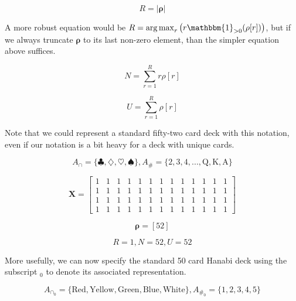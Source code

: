\documentclass{article}
\DeclareMathOperator*{\argmax}{arg\,max}
\begin{document}
\begin{equation}
    R = \lvert\bm{\rho}\rvert
\end{equation}

A more robust equation would be $R = \argmax_r{ \left ( r\mathbbm{1}_{>0}(\rho[r])\right )}$, but if we always truncate $\bm{\rho}$ to its last non-zero element, than the simpler equation above suffices.

\begin{equation}
    N = \sum_{r=1}^{R} r \rho[r]
\end{equation}

\begin{equation}
    U = \sum_{r=1}^{R} \rho[r]
\end{equation}

Note that we could represent a standard fifty-two card deck with this notation, even if our notation is a bit heavy for a deck with unique cards. 

\begin{equation}
A_\cap = \{\clubsuit, \diamondsuit, \heartsuit, \spadesuit\}, 
A_{\#} = \{2, 3, 4, ..., \text{Q}, \text{K}, \text{A}\}
\end{equation}

\begin{equation}
    \bm{X} = \begin{bmatrix} 1 & 1 & 1 & 1 & 1& 1 & 1 & 1 & 1& 1 &1 & 1 & 1\\1 & 1 & 1 & 1 & 1& 1 & 1 & 1 & 1& 1 & 1 & 1 & 1\\1 & 1 & 1 & 1 & 1& 1 & 1 & 1 & 1& 1 & 1 & 1 & 1\\1 & 1 & 1 & 1 & 1& 1 & 1 & 1 & 1& 1 & 1 & 1 & 1
\end{bmatrix}
\end{equation}

\begin{equation}
    \bm{\rho} = [52]
\end{equation}

\begin{equation}
R = 1, N = 52, U = 52
\end{equation}

More usefully, we can now specify the standard 50 card Hanabi deck using the subscript $_0$ to denote its associated representation.

\begin{equation}
A_{\cap_0} = \{\text{Red}, \text{Yellow}, \text{Green}, \text{Blue}, \text{White}\}, 
A_{\#_0} = \{1, 2, 3, 4, 5\}
\end{equation}
\end{document}
